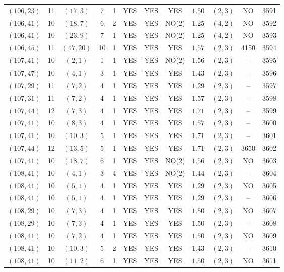\begin{longtable}{|c|c|c|c|c|c|c|c|c|c|c|c|}
$(106,23)$ & 11 & $(17,3)$ & 7 & 1 & YES & YES & YES & $1.50$ & $(2,3)$ & NO & 3591\\
$(106,41)$ & 10 & $(18,7)$ & 6 & 2 & YES & YES & NO(2) & $1.25$ & $(4,2)$ & NO & 3592\\
$(106,41)$ & 10 & $(23,9)$ & 7 & 1 & YES & YES & NO(2) & $1.25$ & $(4,2)$ & NO & 3593\\
$(106,45)$ & 11 & $(47,20)$ & 10 & 1 & YES & YES & YES & $1.57$ & $(2,3)$ & 4150 & 3594\\
$(107,41)$ & 10 & $(2,1)$ & 1 & 1 & YES & YES & NO(2) & $1.56$ & $(2,3)$ & -- & 3595\\
$(107,47)$ & 10 & $(4,1)$ & 3 & 1 & YES & YES & YES & $1.43$ & $(2,3)$ & -- & 3596\\
$(107,29)$ & 11 & $(7,2)$ & 4 & 1 & YES & YES & YES & $1.29$ & $(2,3)$ & -- & 3597\\
$(107,31)$ & 11 & $(7,2)$ & 4 & 1 & YES & YES & YES & $1.57$ & $(2,3)$ & -- & 3598\\
$(107,44)$ & 12 & $(7,3)$ & 4 & 1 & YES & YES & YES & $1.71$ & $(2,3)$ & -- & 3599\\
$(107,41)$ & 10 & $(8,3)$ & 4 & 1 & YES & YES & YES & $1.57$ & $(2,3)$ & -- & 3600\\
$(107,41)$ & 10 & $(10,3)$ & 5 & 1 & YES & YES & YES & $1.71$ & $(2,3)$ & -- & 3601\\
$(107,44)$ & 12 & $(13,5)$ & 5 & 1 & YES & YES & YES & $1.71$ & $(2,3)$ & 3650 & 3602\\
$(107,41)$ & 10 & $(18,7)$ & 6 & 1 & YES & YES & NO(2) & $1.56$ & $(2,3)$ & NO & 3603\\
$(108,41)$ & 10 & $(4,1)$ & 3 & 4 & YES & YES & NO(2) & $1.44$ & $(2,3)$ & -- & 3604\\
$(108,41)$ & 10 & $(5,1)$ & 4 & 1 & YES & YES & YES & $1.29$ & $(2,3)$ & NO & 3605\\
$(108,41)$ & 10 & $(5,1)$ & 4 & 1 & YES & YES & YES & $1.29$ & $(2,3)$ & -- & 3606\\
$(108,29)$ & 10 & $(7,3)$ & 4 & 1 & YES & YES & YES & $1.50$ & $(2,3)$ & NO & 3607\\
$(108,29)$ & 10 & $(7,3)$ & 4 & 1 & YES & YES & YES & $1.50$ & $(2,3)$ & -- & 3608\\
$(108,41)$ & 10 & $(7,2)$ & 4 & 1 & YES & YES & YES & $1.50$ & $(2,3)$ & NO & 3609\\
$(108,41)$ & 10 & $(10,3)$ & 5 & 2 & YES & YES & YES & $1.43$ & $(2,3)$ & -- & 3610\\
$(108,41)$ & 10 & $(11,2)$ & 6 & 1 & YES & YES & YES & $1.50$ & $(2,3)$ & NO & 3611\\

\end{longtable}
